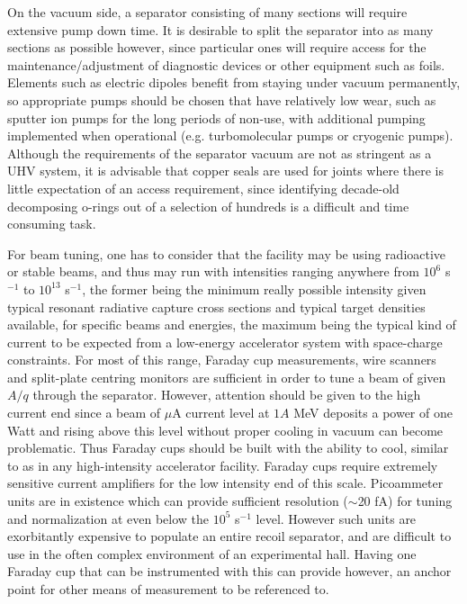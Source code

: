 On the vacuum side, a separator consisting of many sections will require extensive pump down time. It is desirable to split the separator into as many sections as possible however, since particular ones will require access for the maintenance/adjustment of diagnostic devices or other equipment such as foils. Elements such as electric dipoles benefit from staying under vacuum permanently, so appropriate pumps should be chosen that have relatively low wear, such as sputter ion pumps for the long periods of non-use, with additional pumping implemented when operational (e.g. turbomolecular pumps or cryogenic pumps). Although the requirements of the separator vacuum are not as stringent as a UHV system, it is advisable that copper seals are used for joints where there is little expectation of an access requirement, since identifying decade-old decomposing o-rings out of a selection of hundreds is a difficult and time consuming task.

For beam tuning, one has to consider that the facility may be using radioactive or stable beams, and thus may run with intensities ranging anywhere from $10^{6}$ s$^{-1}$ to $10^{13}$ s$^{-1}$, the former being the minimum really possible intensity given typical resonant radiative capture cross sections and typical target densities available, for specific beams and energies, the maximum being the typical kind of current to be expected from a low-energy accelerator system with space-charge constraints. For most of this range, Faraday cup measurements, wire scanners and split-plate centring monitors are sufficient in order to tune a beam of given $A/q$ through the separator. However, attention should be given to the high current end since a beam of $\mu$A current level at $1A$ MeV deposits a power of  one Watt and rising above this level without proper cooling in vacuum can become problematic. Thus Faraday cups should be built with the ability to cool, similar to as in any high-intensity accelerator facility. Faraday cups require extremely sensitive current amplifiers for the low intensity end of this scale. Picoammeter units are in existence which can provide sufficient resolution ($\sim$20 fA) for tuning and normalization at even below the $10^{5}$ s$^{-1}$ level. However such units are exorbitantly expensive to populate an entire recoil separator, and are difficult to use in the often complex environment of an experimental hall. Having one Faraday cup that can be instrumented with this can provide however, an anchor point for other means of measurement to be referenced to. 

